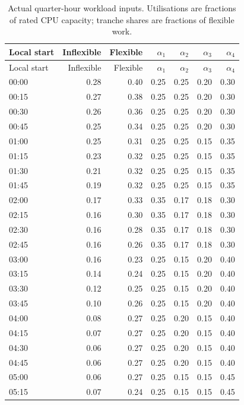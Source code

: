 \begin{longtable}{@{}lrrrrrr@{}}
\caption{Actual quarter-hour workload inputs. Utilisations are fractions of rated CPU capacity; tranche shares are fractions of flexible work.}\label{tab:workload-inputs}\\\toprule
Local start & Inflexible & Flexible & $\alpha_1$ & $\alpha_2$ & $\alpha_3$ & $\alpha_4$ \\\midrule\endfirsthead
\toprule
Local start & Inflexible & Flexible & $\alpha_1$ & $\alpha_2$ & $\alpha_3$ & $\alpha_4$ \\\midrule\endhead
00:00 & 0.28 & 0.40 & 0.25 & 0.25 & 0.20 & 0.30 \\
00:15 & 0.27 & 0.38 & 0.25 & 0.25 & 0.20 & 0.30 \\
00:30 & 0.26 & 0.36 & 0.25 & 0.25 & 0.20 & 0.30 \\
00:45 & 0.25 & 0.34 & 0.25 & 0.25 & 0.20 & 0.30 \\
01:00 & 0.25 & 0.31 & 0.25 & 0.25 & 0.15 & 0.35 \\
01:15 & 0.23 & 0.32 & 0.25 & 0.25 & 0.15 & 0.35 \\
01:30 & 0.21 & 0.32 & 0.25 & 0.25 & 0.15 & 0.35 \\
01:45 & 0.19 & 0.32 & 0.25 & 0.25 & 0.15 & 0.35 \\
02:00 & 0.17 & 0.33 & 0.35 & 0.17 & 0.18 & 0.30 \\
02:15 & 0.16 & 0.30 & 0.35 & 0.17 & 0.18 & 0.30 \\
02:30 & 0.16 & 0.28 & 0.35 & 0.17 & 0.18 & 0.30 \\
02:45 & 0.16 & 0.26 & 0.35 & 0.17 & 0.18 & 0.30 \\
03:00 & 0.16 & 0.23 & 0.25 & 0.15 & 0.20 & 0.40 \\
03:15 & 0.14 & 0.24 & 0.25 & 0.15 & 0.20 & 0.40 \\
03:30 & 0.12 & 0.25 & 0.25 & 0.15 & 0.20 & 0.40 \\
03:45 & 0.10 & 0.26 & 0.25 & 0.15 & 0.20 & 0.40 \\
04:00 & 0.08 & 0.27 & 0.25 & 0.20 & 0.15 & 0.40 \\
04:15 & 0.07 & 0.27 & 0.25 & 0.20 & 0.15 & 0.40 \\
04:30 & 0.06 & 0.27 & 0.25 & 0.20 & 0.15 & 0.40 \\
04:45 & 0.06 & 0.27 & 0.25 & 0.20 & 0.15 & 0.40 \\
05:00 & 0.06 & 0.27 & 0.25 & 0.15 & 0.15 & 0.45 \\
05:15 & 0.07 & 0.24 & 0.25 & 0.15 & 0.15 & 0.45 \\

\end{longtable}
